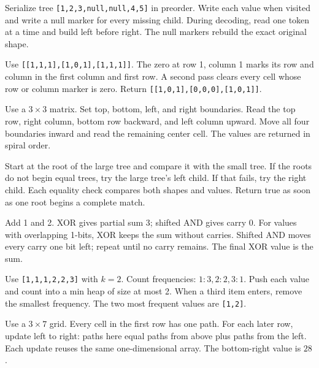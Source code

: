 \expandafter\def\csname lessontrace@57\endcsname{\visualtrace
  {Serialize tree \texttt{[1,2,3,null,null,4,5]} in preorder.}
  {Write each value when visited and write a null marker for every missing child.}
  {During decoding, read one token at a time and build left before right.}
  {The null markers rebuild the exact original shape.}}

\expandafter\def\csname lessontrace@58\endcsname{\visualtrace
  {Use \texttt{[[1,1,1],[1,0,1],[1,1,1]]}.}
  {The zero at row 1, column 1 marks its row and column in the first column and first row.}
  {A second pass clears every cell whose row or column marker is zero.}
  {Return \texttt{[[1,0,1],[0,0,0],[1,0,1]]}.}}

\expandafter\def\csname lessontrace@59\endcsname{\visualtrace
  {Use a \(3\times3\) matrix. Set top, bottom, left, and right boundaries.}
  {Read the top row, right column, bottom row backward, and left column upward.}
  {Move all four boundaries inward and read the remaining center cell.}
  {The values are returned in spiral order.}}

\expandafter\def\csname lessontrace@60\endcsname{\visualtrace
  {Start at the root of the large tree and compare it with the small tree.}
  {If the roots do not begin equal trees, try the large tree's left child.}
  {If that fails, try the right child. Each equality check compares both shapes and values.}
  {Return true as soon as one root begins a complete match.}}

\expandafter\def\csname lessontrace@61\endcsname{\visualtrace
  {Add 1 and 2. XOR gives partial sum 3; shifted AND gives carry 0.}
  {For values with overlapping 1-bits, XOR keeps the sum without carries.}
  {Shifted AND moves every carry one bit left; repeat until no carry remains.}
  {The final XOR value is the sum.}}

\expandafter\def\csname lessontrace@62\endcsname{\visualtrace
  {Use \texttt{[1,1,1,2,2,3]} with \(k=2\). Count frequencies: \(1:3,2:2,3:1\).}
  {Push each value and count into a min heap of size at most 2.}
  {When a third item enters, remove the smallest frequency.}
  {The two most frequent values are \texttt{[1,2]}.}}

\expandafter\def\csname lessontrace@63\endcsname{\visualtrace
  {Use a \(3\times7\) grid. Every cell in the first row has one path.}
  {For each later row, update left to right: paths here equal paths from above plus paths from the left.}
  {Each update reuses the same one-dimensional array.}
  {The bottom-right value is \(28\).}}

